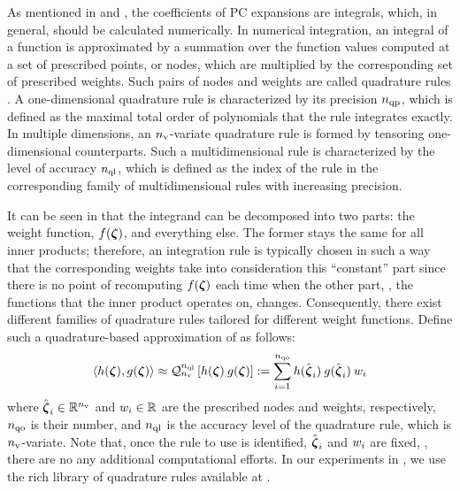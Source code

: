 As mentioned in  and , the coefficients of PC expansions are integrals, which, in general, should be calculated numerically.
In numerical integration, an integral of a function is approximated by a summation over the function values computed at a set of prescribed points, or nodes, which are multiplied by the corresponding set of prescribed weights.
Such pairs of nodes and weights are called quadrature rules \cite{press2007}.
A one-dimensional quadrature rule is characterized by its precision ${n_\text{qp}}$, which is defined as the maximal total order \cite{heiss2008} of polynomials that the rule integrates exactly.
In multiple dimensions, an ${n_\text{v}}$-variate quadrature rule is formed by tensoring one-dimensional counterparts. Such a multidimensional rule is characterized by the level of accuracy ${n_\text{ql}}$, which is defined as the index of the rule in the corresponding family of multidimensional rules with increasing precision.

It can be seen in  that the integrand can be decomposed into two parts: the weight function, $f(\boldsymbol{\zeta})$, and everything else.
The former stays the same for all inner products; therefore, an integration rule is typically chosen in such a way that the corresponding weights take into consideration this ``constant'' part since there is no point of recomputing $f(\boldsymbol{\zeta})$ each time when the other part, \ie, the functions that the inner product operates on, changes.
Consequently, there exist different families of quadrature rules tailored for different weight functions.
Define such a quadrature-based approximation of  as follows:
\[
  \oInner{h(\vz)}{g(\vz)} \approx \oQuad{\nvars}{\qdlevel}{h(\vz) \: g(\vz)} := \sum_{i = 1}^{\qdorder} h(\qdn{\vz}_i) \: g(\qdn{\vz}_i) \: \qdw_i
\]
where $\hat{\boldsymbol{\zeta}}_i \in \mathbb{R}^{n_\text{v}}$ and $w_i \in \mathbb{R}$ are the prescribed nodes and weights, respectively, ${n_\text{qo}}$ is their number, and ${n_\text{ql}}$ is the accuracy level of the quadrature rule, which is ${n_\text{v}}$-variate.
Note that, once the rule to use is identified, $\hat{\boldsymbol{\zeta}}_i$ and $w_i$ are fixed, \ie, there are no any additional computational efforts.
In our experiments in , we use the rich library of quadrature rules available at \cite{burkardt2013}.

